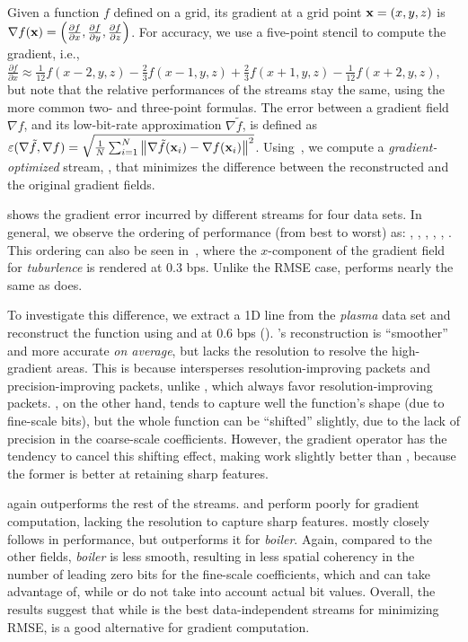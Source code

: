 Given a function $f$ defined on a grid, its gradient at a grid point \mbox{$\x = (x,y,z)$} is
$\nabla f(\x) = \left(\frac{\partial f}{\partial x}, \frac{\partial f}{\partial y}, \frac{\partial
f}{\partial z}\right)$. For accuracy, we use a five-point stencil to compute the gradient, i.e.,
$\frac{\partial f}{\partial x} \approx \frac{1}{12}f(x-2,y,z) - \frac{2}{3}f(x-1,y,z) +
\frac{2}{3}f(x+1,y,z) - \frac{1}{12}f(x+2,y,z)$, but note that the relative performances of the
streams stay the same, using the more common two- and three-point formulas. The error between a
gradient field $\nabla f$, and its low-bit-rate approximation $\nabla
\tilde{f}$, is defined as $\err(\nabla \tilde{f}, \nabla f) = \sqrt{\frac{1}{N}
\sum_{i=1}^{N}{\norm{\nabla \tilde{f}(\x_i)-\nabla f(\x_i)}^2}}$. Using~, we
compute a \emph{gradient-optimized} stream, \sgop, that minimizes the difference between the
reconstructed and the original gradient fields.

 shows the gradient error incurred by different streams for four
data sets. In general, we observe the ordering of performance (from best to worst) as: \sgop, \sgsg,
\sbit, \swav, \smag, \slvl. This ordering can also be seen in~,
where the $x$-component of the gradient field for \emph{tuburlence} is rendered at 0.3 bps. Unlike
the RMSE case, \sbit performs nearly the same as \swav does.

To investigate this difference, we extract a 1D line from the \emph{plasma} data set and reconstruct
the function using \sbit and \swav at 0.6 bps
(). \swav's reconstruction is ``smoother'' and more
accurate \emph{on average}, but lacks the resolution to resolve the high-gradient areas. This is
because \swav intersperses resolution-improving packets and precision-improving packets, unlike
\sbit, which always favor resolution-improving packets. \sbit, on the other hand, tends to capture
well the function's shape (due to fine-scale bits), but the whole function can be ``shifted''
slightly, due to the lack of precision in the coarse-scale coefficients. However, the gradient
operator has the tendency to cancel this shifting effect, making \sbit work slightly better than
\swav, because the former is better at retaining sharp features.

\sgop again outperforms the rest of the streams. \slvl and \smag perform poorly for gradient
computation, lacking the resolution to capture sharp features. \sgsg mostly closely follows \sbit in
performance, but outperforms it for \emph{boiler}. Again, compared to the other fields,
\emph{boiler} is less smooth, resulting in less spatial coherency in the number of leading zero bits
for the fine-scale coefficients, which \sgop and \sgsg can take advantage of, while \swav or \sbit
do not take into account actual bit values. Overall, the results suggest that while \swav is the
best data-independent streams for minimizing RMSE, \sbit is a good alternative for gradient
computation.

